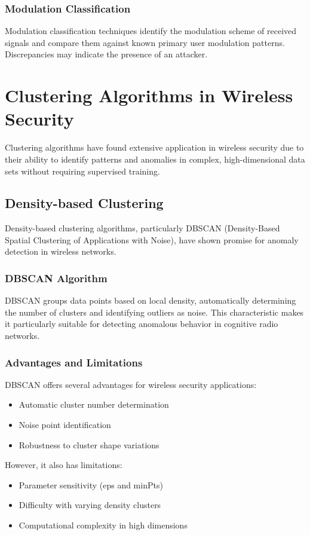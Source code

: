 \subsubsection{Modulation Classification}
Modulation classification techniques identify the modulation scheme of received signals and compare them against known primary user modulation patterns. Discrepancies may indicate the presence of an attacker.

\section{Clustering Algorithms in Wireless Security}
Clustering algorithms have found extensive application in wireless security due to their ability to identify patterns and anomalies in complex, high-dimensional data sets without requiring supervised training.

\subsection{Density-based Clustering}
Density-based clustering algorithms, particularly DBSCAN (Density-Based Spatial Clustering of Applications with Noise), have shown promise for anomaly detection in wireless networks.

\subsubsection{DBSCAN Algorithm}
DBSCAN groups data points based on local density, automatically determining the number of clusters and identifying outliers as noise. This characteristic makes it particularly suitable for detecting anomalous behavior in cognitive radio networks.

\subsubsection{Advantages and Limitations}
DBSCAN offers several advantages for wireless security applications:
\begin{itemize}
\item Automatic cluster number determination
\item Noise point identification
\item Robustness to cluster shape variations
\end{itemize}

However, it also has limitations:
\begin{itemize}
\item Parameter sensitivity (eps and minPts)
\item Difficulty with varying density clusters
\item Computational complexity in high dimensions
\end{itemize}

